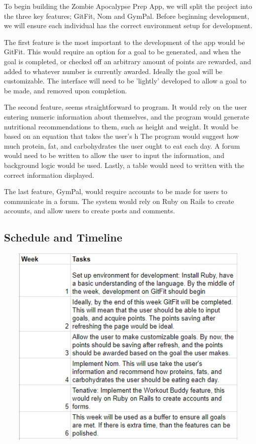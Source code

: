 \documentclass[a4paper]{article}
\begin{document}
To begin building the Zombie Apocalypse Prep App, we will split the project into the three key features; GitFit, Nom and GymPal. Before beginning development, we will ensure each individual has the correct environment setup for development.\newline

\noindent The first feature is the most important to the development of the app would be GitFit. This would require an option for a goal to be generated, and when the goal is completed, or checked off an arbitrary amount of points are rewarded, and added to whatever number is currently awarded. Ideally the goal will be customizable. The interface will need to be 'lightly' developed to allow a goal to be made, and removed upon completion.\newline

\noindent The second feature, seems straightforward to program. It would rely on the user entering numeric information about themselves, and the program would generate nutritional recommendations to them, such as height and weight. It would be based on an equation that takes the user's h The program would suggest how much protein, fat, and carbohydrates the user ought to eat each day. A forum would need to be written to allow the user to input the information, and background logic would be used. Lastly, a table would need to written with the correct information displayed.\newline

\noindent The last feature, GymPal, would require accounts to be made for users to communicate in a forum. The system would rely on Ruby on Rails to create accounts, and allow users to create posts and comments. \newline

\subsection{Schedule and Timeline} 

\graphicspath{ {files/Capture.png} }
\includegraphics[width = 15cm, height=10cm]{Capture}\\ 
\end{document}

